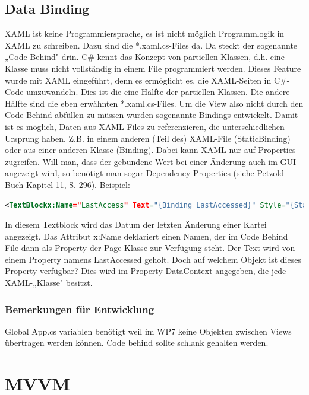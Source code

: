 \documentclass[a4paper,10pt]{scrreprt}
\begin{document}
\section{Data Binding}
XAML ist keine Programmiersprache, es ist nicht möglich Programmlogik in XAML zu schreiben. Dazu sind die
*.xaml.cs-Files da. Da steckt der sogenannte „Code Behind" drin. C\# kennt das Konzept von partiellen Klassen,
d.h. eine Klasse muss nicht vollständig in einem File programmiert werden. Dieses Feature wurde mit XAML
eingeführt, denn es ermöglicht es, die XAML-Seiten in C\#-Code umzuwandeln. Dies ist die eine Hälfte der
partiellen Klassen. Die andere Hälfte sind die eben erwähnten *.xaml.cs-Files.
Um die View also nicht durch den Code Behind abfüllen zu müssen wurden sogenannte Bindings entwickelt.
Damit ist es möglich, Daten aus XAML-Files zu referenzieren, die unterschiedlichen Ursprung haben. Z.B. in
einem anderen (Teil des) XAML-File (StaticBinding) oder aus einer anderen Klasse (Binding). Dabei kann XAML
nur auf Properties zugreifen. Will man, dass der gebundene Wert bei einer Änderung auch im GUI angezeigt
wird, so benötigt man sogar Dependency Properties (siehe Petzold-Buch Kapitel 11, S. 296). Beispiel:

\begin{lstlisting}[caption=Data Binding Example,language=xml]
 <TextBlockx:Name="LastAccess" Text="{Binding LastAccessed}" Style="{StaticResource contentStyle}"/>
\end{lstlisting}
In diesem Textblock wird das Datum der letzten Änderung einer Kartei angezeigt. Das Attribut x:Name deklariert
einen Namen, der im Code Behind File dann als Property der Page-Klasse zur Verfügung steht. Der Text wird von
einem Property namens LastAccessed geholt. Doch auf welchem Objekt ist dieses Property verfügbar? Dies wird
im Property DataContext angegeben, die jede XAML-„Klasse" besitzt.


\subsection{Bemerkungen für Entwicklung}
Global App.cs variablen benötigt weil im WP7 keine Objekten zwischen Views übertragen werden können.
Code behind sollte schlank gehalten werden.

\chapter{MVVM}
\end{document}
